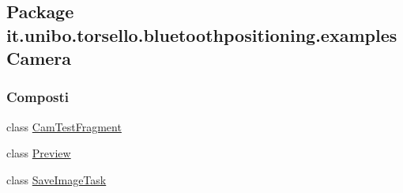 \hypertarget{namespaceit_1_1unibo_1_1torsello_1_1bluetoothpositioning_1_1examplesCamera}{}\subsection{Package it.\+unibo.\+torsello.\+bluetoothpositioning.\+examples\+Camera}
\label{namespaceit_1_1unibo_1_1torsello_1_1bluetoothpositioning_1_1examplesCamera}
\subsubsection*{Composti}
\begin{DoxyCompactItemize}
\item 
class \hyperlink{classit_1_1unibo_1_1torsello_1_1bluetoothpositioning_1_1examplesCamera_1_1CamTestFragment}{Cam\+Test\+Fragment}
\item 
class \hyperlink{classit_1_1unibo_1_1torsello_1_1bluetoothpositioning_1_1examplesCamera_1_1Preview}{Preview}
\item 
class \hyperlink{classit_1_1unibo_1_1torsello_1_1bluetoothpositioning_1_1examplesCamera_1_1SaveImageTask}{Save\+Image\+Task}
\end{DoxyCompactItemize}
